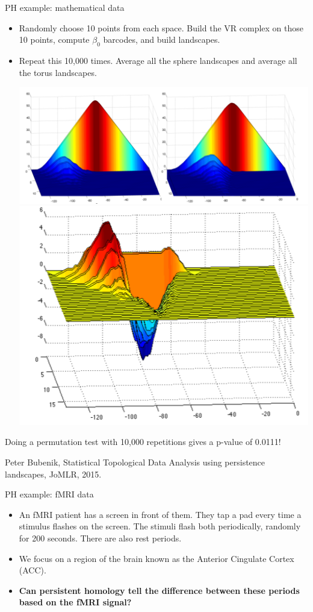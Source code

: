 \documentclass[usenames,dvipsnames,aspectratio=1610]{beamer}
\begin{document}
\begin{frame}{PH example: mathematical data}
  \begin{itemize}
    \item Randomly choose 10 points from each space. Build the VR complex on 
      those 10 points, compute $\beta_0$ barcodes, and build landscapes. 
    \item Repeat this 10,000 times. Average all the sphere landscapes and average
      all the torus landscapes.
      \begin{center}
	\includegraphics[scale=0.4]{images/pl_compare1.png}
	\pause
	\includegraphics[scale=0.4]{images/pl_comp2.png}
      \end{center}
  \end{itemize}
  Doing a permutation test with 10,000 repetitions gives a p-value of 0.0111!

  {\tiny Peter Bubenik, Statistical Topological Data Analysis using persistence landscapes,
  JoMLR, 2015.}
\end{frame}


\begin{frame}{PH example: fMRI data}
  \begin{itemize}
    \item An fMRI patient has a screen in front of them. They tap
	a pad every time a stimulus flashes on the screen. The stimuli flash both periodically,
	randomly for 200 seconds. There are also rest periods.
      \item We focus on a region of the brain known as the Anterior Cingulate Cortex (ACC).
      \item {\bf Can persistent homology tell the difference between
	these periods based on the fMRI signal?}
  \end{itemize}
\end{frame}
\end{document}

